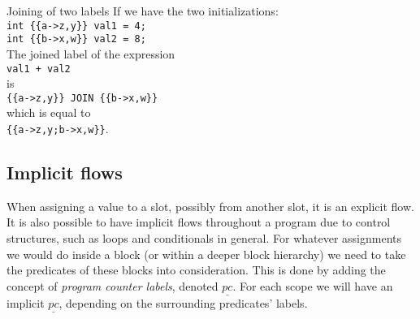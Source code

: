 \begin{example}{Joining of two labels}
  If we have the two initializations:\\
  \texttt{int \{\{a->z,y\}\} val1 = 4;}\\
  \texttt{int \{\{b->x,w\}\} val2 = 8;}\\[1em]
  The joined label of the expression\\
   \texttt{val1 + val2}\\
   is\\
   \texttt{\{\{a->z,y\}\} JOIN \{\{b->x,w\}\}}\\
   which is equal to\\
   \texttt{\{\{a->z,y;b->x,w\}\}}.
\end{example}

\subsection{Implicit flows}
\newcommand{\dlmpc}{$\underline{pc}$}
When assigning a value to a slot, possibly from another slot, it is an explicit flow.
It is also possible to have implicit flows throughout a program due to control structures, such as loops and conditionals in general.
For whatever assignments we would do inside a block (or within a deeper block hierarchy) we need to take the predicates of these blocks into consideration.
This is done by adding the concept of \emph{program counter labels}, denoted \dlmpc.
For each scope we will have an implicit \dlmpc, depending on the surrounding predicates' labels.

